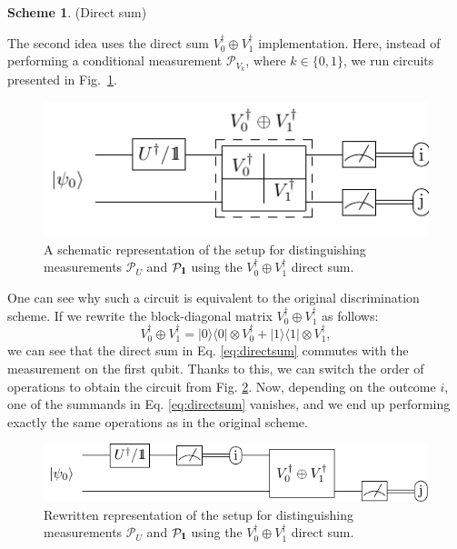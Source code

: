 \documentclass[preprint,12pt, a4paper, dvipsnames]{elsarticle}
\newcommand{\ket}[1]{\ensuremath{|#1\rangle}}
\newcommand{\bra}[1]{\ensuremath{\langle#1|}}
\newcommand{\ketbra}[2]{\ensuremath{\ket{#1}\bra{#2}}}
\newcommand{\proj}[1]{\ensuremath{\ketbra{#1}{#1}}}
\newcommand{\1}{{\rm 1\hspace{-0.9mm}l}}
\newcommand{\Id}{{\rm 1\hspace{-0.9mm}l}}
\newcommand{\PP}{\mathcal{P}}
\theoremstyle{definition}
\newtheorem{scheme}{Scheme}
\begin{document}
\begin{scheme}(Direct sum)

The second idea uses the direct sum $V_0^\dagger \oplus V_1^\dagger$ implementation.     Here, instead of performing a conditional
measurement $\PP_{V_k}$, where $k\in \{0,1\}$,  we run circuits presented in
Fig.~\ref{fig:controlled}.

	\begin{figure}[h!]
		\centering
		\includegraphics[scale=1.5]{pics/controlled_unitary}

		\caption{ A schematic representation of the setup for distinguishing
			measurements $\PP_{U}$ and $\PP_{\Id}$ using the $V_0^\dagger \oplus V_1^\dagger$ direct sum.
		}\label{fig:controlled}
	\end{figure}

	One can see why such a circuit is equivalent to the original discrimination scheme.
	If we rewrite the block-diagonal matrix $V_0^\dagger \oplus V_1^\dagger$ as follows:
	\begin{equation}
		\label{eq:directsum}
		V_0^\dagger \oplus V_1^\dagger = \proj{0}\otimes V_0^\dagger + \proj{1} \otimes V_1^\dagger,
	\end{equation}
	we can see that the direct sum in Eq. \eqref{eq:directsum} commutes with the measurement on the
	first qubit. Thanks to this, we can switch the order of operations to obtain the circuit from
	Fig. \ref{fig:directsum}. Now, depending on the outcome $i$, one of the summands in
	Eq. \eqref{eq:directsum} vanishes, and we end up performing exactly the same operations as in the
	original scheme.

	\begin{figure}[h!]
		\centering
		\includegraphics[width=\textwidth]{pics/direct_sum}
		\caption{Rewritten representation of the setup for distinguishing
		measurements $\PP_{U}$ and $\PP_{\Id}$ using the $V_0^\dagger \oplus V_1^\dagger$ direct
		sum.
		}\label{fig:directsum}
	\end{figure}


\end{scheme}
\end{document}
